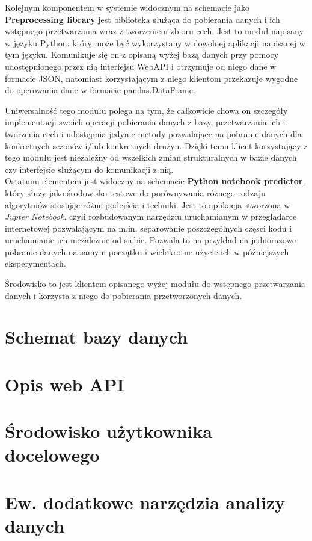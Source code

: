 Kolejnym komponentem w systemie widocznym na schemacie jako \textbf{Preprocessing library} jest biblioteka służąca do pobierania danych i ich wstępnego przetwarzania wraz z tworzeniem zbioru cech. Jest to moduł napisany w języku Python, który może być wykorzystany w dowolnej aplikacji napisanej w tym języku. Komunikuje się on z opisaną wyżej bazą danych przy pomocy udostępnionego przez nią interfejsu WebAPI i otrzymuje od niego dane w formacie JSON, natomiast korzystającym z niego klientom przekazuje wygodne do operowania dane w formacie pandas.DataFrame. 

Uniwersalność tego modułu polega na tym, że całkowicie chowa on szczegóły implementacji swoich operacji pobierania danych z bazy, przetwarzania ich i tworzenia cech i udostępnia jedynie metody pozwalające na pobranie danych dla konkretnych sezonów i/lub konkretnych drużyn. Dzięki temu klient korzystający z tego modułu jest niezależny od wszelkich zmian strukturalnych w bazie danych czy interfejsie służącym do komunikacji z nią.\\


Ostatnim elementem jest widoczny na schemacie \textbf{Python notebook predictor}, który służy jako środowisko testowe do porównywania różnego rodzaju algorytmów stosując różne podejścia i techniki. Jest to aplikacja stworzona w \textit{Jupter Notebook}, czyli rozbudowanym narzędziu uruchamianym w przeglądarce internetowej pozwalającym na m.in. separowanie poszczególnych części kodu i uruchamianie ich niezależnie od siebie. Pozwala to na przykład na jednorazowe pobranie danych na samym początku i wielokrotne użycie ich w późniejszych eksperymentach.

Środowisko to jest klientem opisanego wyżej modułu do wstępnego przetwarzania danych i korzysta z niego do pobierania przetworzonych danych. 


\section{Schemat bazy danych}
\label{database_schema}
\section{Opis web API}
\section{Środowisko użytkownika docelowego}
\section{Ew. dodatkowe narzędzia analizy danych}